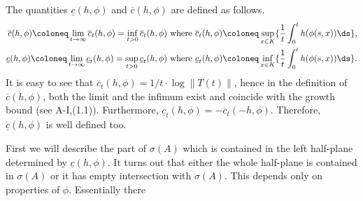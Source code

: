 The quantities $\underline{c}(h,\phi)$ and $\overline{c}(h,\phi)$ are defined as follows.
\begin{equation}\label{eq:b3-4.4}
	\begin{aligned}
		\text{$\overline{c}(h,\phi) \coloneq \lim_{t\to\infty} \overline{c}_{t}(h,\phi) = \inf_{t>0} \overline{c}_{t}(h,\phi)$  where  
		$\overline{c}_{t}(h,\phi) \coloneq \sup_{x\in K} \{\frac{1}{t}\int_{0}^{t} h(\phi(s,x)) \ds \}$,}\\
		\text{$\underline{c}(h,\phi) \coloneq \lim_{t\to\infty} \underline{c}_{t}(h,\phi) = \sup_{t>0} \underline{c}_{t}(h,\phi)$  where 
		$\underline{c}_{t}(h,\phi) \coloneq \inf_{x\in K} \{\frac{1}{t}\int_{0}^{t} h(\phi(s,x)) \ds \}$.}
	\end{aligned}
\end{equation}
It is easy to see that $\overline{c}_{t}(h,\phi) = 1/t\cdot\log\|T(t)\|$, hence in the definition of $\overline{c}(h,\phi)$, both the limit and the infimum exist and coincide with the growth bound (see A-I,(1.1)).
Furthermore, $\underline{c}_{t}(h,\phi) = -\overline{c}_{t}(-h,\phi)$.
Therefore, $\underline{c}(h,\phi)$ is well defined too.

First we will describe the part of $\sigma(A)$ which is contained in the left half-plane determined by $\underline{c}(h,\phi)$.
It turns out that either the whole half-plane is contained in $\sigma(A)$ or it has empty intersection with $\sigma(A)$.
This depends only on properties of $\phi$.
Essentially there
%
%
%


